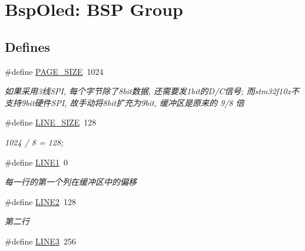 \hypertarget{group___o_l_e_d}{\section{\-Bsp\-Oled\-: \-B\-S\-P \-Group}
\label{group___o_l_e_d}
}
\subsection*{\-Defines}
\begin{DoxyCompactItemize}
\item 
\#define \hyperlink{group___o_l_e_d_ga7d467c1d283fdfa1f2081ba1e0d01b6e}{\-P\-A\-G\-E\-\_\-\-S\-I\-Z\-E}~1024
\begin{DoxyCompactList}\small\item\em 如果采用3线\-S\-P\-I, 每个字节除了8bit数据, 还需要发1bit的\-D/\-C信号; 而stm32f10x不支持9bit硬件\-S\-P\-I, 故手动将8bit扩充为9bit, 缓冲区是原来的 9/8 倍 \end{DoxyCompactList}\item 
\hypertarget{group___o_l_e_d_gaba889888734a8b272a51d444d70ad2fa}{\#define \hyperlink{group___o_l_e_d_gaba889888734a8b272a51d444d70ad2fa}{\-L\-I\-N\-E\-\_\-\-S\-I\-Z\-E}~128}\label{group___o_l_e_d_gaba889888734a8b272a51d444d70ad2fa}

\begin{DoxyCompactList}\small\item\em 1024 / 8 = 128; \end{DoxyCompactList}\item 
\#define \hyperlink{group___o_l_e_d_ga4c0102b3d63c7bd2d59a424ca3815ad1}{\-L\-I\-N\-E1}~0
\begin{DoxyCompactList}\small\item\em 每一行的第一个列在缓冲区中的偏移 \end{DoxyCompactList}\item 
\hypertarget{group___o_l_e_d_ga259e96afd23afb9e2fd9e97d5e07193c}{\#define \hyperlink{group___o_l_e_d_ga259e96afd23afb9e2fd9e97d5e07193c}{\-L\-I\-N\-E2}~128}\label{group___o_l_e_d_ga259e96afd23afb9e2fd9e97d5e07193c}

\begin{DoxyCompactList}\small\item\em 第二行 \end{DoxyCompactList}\item 
\hypertarget{group___o_l_e_d_ga27d3731f13f3206f556a2f2487f595ed}{\#define \hyperlink{group___o_l_e_d_ga27d3731f13f3206f556a2f2487f595ed}{\-L\-I\-N\-E3}~256}\label{group___o_l_e_d_ga27d3731f13f3206f556a2f2487f595ed}


\end{DoxyCompactItemize}
